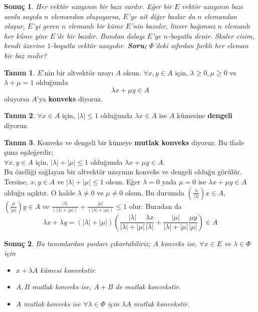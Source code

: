 \documentclass[11pt]{article}
\theoremstyle{plain}
\newtheorem{corollary}{Sonuç}
\theoremstyle{definition}
\newtheorem{definition}{Tanım}
\theoremstyle{remark}
\numberwithin{equation}{section}
\renewcommand{\%}{{\small \%}}
\begin{document}
\begin{corollary} Her vektör uzayının bir bazı vardır. Eğer bir $E$ vektör uzayının bazı sonlu sayıda $n$ elemandan oluşuyorsa, $E$'ye ait diğer bazlar da $n$ elemandan oluşur, $E$'yi geren $n$ elemanlı bir küme $E$'nin bazıdır, lineer bağımsız $n$ elemanlı her küme yine $E$'de bir bazdır. Bundan dolayı $E$'ye \emph{$n$-boyutlu} denir. Skaler cisim, kendi üzerine $1$-boyutlu vektör uzayıdır.
\textbf{Soru;} \emph{$\Phi$'deki sıfırdan farklı her eleman bir baz mıdır?}\\[5pt]
\end{corollary}

\begin{definition}
$E$'nin bir altvektör uzayı $A$ olsun. $\forall x,y\in A$ için, $\lambda\geq 0, \mu\geq 0$ ve $\lambda +\mu =1$ olduğunda
\[
\lambda x+\mu y\in A
\] oluyorsa $A$'ya \textbf{konveks} diyoruz.
\end{definition}

\begin{definition}
$\forall x\in A$ için, $|\lambda|\leq 1$ olduğunda $\lambda x\in A$ ise $A$ kümesine \textbf{dengeli} diyoruz.
\end{definition}
\begin{definition}
Konveks ve dengeli bir kümeye \textbf{mutlak konveks} diyoruz. Bu ifade şuna eşdeğerdir;\\
$\forall x,y\in A$ için, $|\lambda|+|\mu|\leq 1$ olduğunda $\lambda x+\mu y\in A$.\\
Bu özelliği sağlayan bir altvektör uzayının konveks ve dengeli olduğu görülür.\\
Tersine, $x,y\in A$ ve $|\lambda|+|\mu|\leq 1$ olsun. Eğer $\lambda =0$ yada $\mu =0$ ise $\lambda x+\mu y \in A$ olduğu açıktır. O halde $\lambda\neq 0$ ve $\mu\neq 0$ olsun. Bu durumda $\left(\frac{\lambda}{|\lambda|}\right)x\in A$, $\left(\frac{\mu}{|\mu|}\right)y\in A$ ve $\frac{|\lambda|}{\left(|\lambda|+|\mu|\right)}+\frac{|\mu|}{\left(|\lambda|+|\mu|\right)}\leq 1$ olur. Buradan da
\[
\lambda x+\lambda y=\left(|\lambda|+|\mu|\right)\left(\frac{|\lambda|}{|\lambda|+|\mu|}\frac{\lambda x}{|\lambda|}+\frac{|\mu|}{|\lambda|+|\mu|}\frac{\mu y}{|\mu|}\right)\in A
\]
\end{definition}
\begin{corollary}
Bu tanımlardan şunları çıkartabiliriz; $A$ konveks ise, $\forall x\in E$ ve $\lambda\in\Phi$ için
\begin{itemize}
\item[a)] $x+\lambda A$ kümesi konvekstir.
\item[b)] $A, B$ mutlak konveks ise, $A+B$ de mutlak konvekstir.
\item[c)] $A$ mutlak konveks ise $\forall\lambda\in\Phi$ için $\lambda A$ mutlak konvekstir.
\end{itemize}
\end{corollary}
\end{document}
